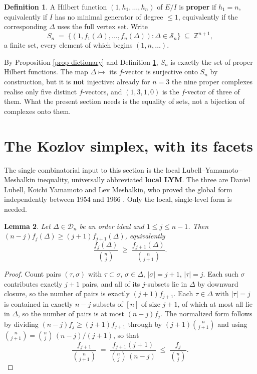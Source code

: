 \documentclass[11pt, a4paper, abstract=yes]{scrartcl}
\theoremstyle{definition}
\newtheorem{definition}{Definition}
\theoremstyle{remark}
\theoremstyle{plain}
\newtheorem{lemma}[definition]{Lemma}
\begin{document}
\begin{definition}
A Hilbert function \((1,h_1,\dots,h_n)\) of \(E/I\) is \textbf{proper} if \(h_1=n\), equivalently if \(I\)
has no minimal generator of degree \(\le1\), equivalently if the corresponding \(\Delta\) uses the
full vertex set. Write
\begin{equation}\label{eq:proper}
  S_n\;=\;\bigl\lbrace(1,f_1(\Delta),\dots,f_n(\Delta)):\Delta\in\mathcal S_n\bigr\rbrace
   \;\subseteq\;\mathbb Z^{n+1},
\end{equation}
a finite set, every element of which begins \((1,n,\dots)\).
\label{def-proper}
\end{definition}

By Proposition \ref{prop-dictionary} and Definition \ref{def-proper}, \(S_n\) is exactly the set of
proper Hilbert functions. The map \(\Delta\mapsto\) its \(f\)-vector is surjective onto \(S_n\) by
construction, but it is \textbf{not} injective: already for \(n=3\) the nine proper complexes realise only
five distinct \(f\)-vectors, and \((1,3,1,0)\) is the \(f\)-vector of three of them. What the
present section needs is the equality of sets, not a bijection of complexes onto them.
\section{The Kozlov simplex, with its facets}
\label{sec-kozlov}
The single combinatorial input to this section is the local Lubell--Yamamoto--Meshalkin inequality,
universally abbreviated \textbf{local LYM}. The three are Daniel Lubell, Koichi Yamamoto and Lev
Meshalkin, who proved the global form independently between 1954 and 1966 \autocite{Yamamoto1954,Meshalkin1963,Lubell1966}. Only the local, single-level form is needed.

\begin{lemma}
Let \(\Delta\in\mathcal D_n\) be an order ideal and \(1\le j\le n-1\). Then
\((n-j)f_j(\Delta)\ge(j+1)f_{j+1}(\Delta)\), equivalently
\begin{equation}\label{eq:lym}
  \frac{f_j(\Delta)}{\binom nj}\;\ge\;\frac{f_{j+1}(\Delta)}{\binom n{j+1}}.
\end{equation}
\label{lem:lym}
\label{lem-lym}
\end{lemma}

\begin{proof}
Count pairs \((\tau,\sigma)\) with \(\tau\subset\sigma\), \(\sigma\in\Delta\), \(|\sigma|=j+1\),
\(|\tau|=j\). Each such \(\sigma\) contributes exactly \(j+1\) pairs, and all of its \(j\)-subsets
lie in \(\Delta\) by downward closure, so the number of pairs is exactly \((j+1)f_{j+1}\). Each
\(\tau\in\Delta\) with \(|\tau|=j\) is contained in exactly \(n-j\) subsets of \([n]\) of size
\(j+1\), of which at most all lie in \(\Delta\), so the number of pairs is at most \((n-j)f_j\). The
normalized form follows by dividing \((n-j)f_j\ge(j+1)f_{j+1}\) through by
\((j+1)\binom n{j+1}\) and using \(\binom n{j+1}=\binom nj\,(n-j)/(j+1)\), so that
\begin{equation}\label{eq:lym-2}
  \frac{f_{j+1}}{\binom n{j+1}}\;=\;\frac{f_{j+1}(j+1)}{\binom nj\,(n-j)}
  \;\le\;\frac{f_j}{\binom nj}.
\end{equation}
\end{proof}
\end{document}
